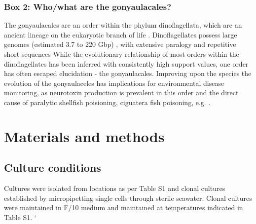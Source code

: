 \documentclass[12pt]{article}
\begin{document}
\subsubsection*{Box 2: Who/what are the gonyaulacales?}
The gonyaulacales are an order within the phylum dinoflagellata, which are an ancient lineage on the eukaryotic branch of life \cite{moldowan1998biogeochemical}. 
Dinoflagellates possess large genomes (estimated 3.7 to 220 Gbp) \cite{casabianca2017genome}, with extensive paralogy and repetitive short sequences %
While the evolutionary relationship of most orders within the dinoflagellates has been inferred with consistently high support values, one order has often escaped elucidation - the gonyaulacales. 
Improving upon the species the evolution of the gonyaulaceles has implications for environmental disease monitoring, as neurotoxin production is prevalent in this order and the direct cause of paralytic shellfish poisioning, ciguatera fish poisoning, e.g. \cite{shalchian2006combined,zhang2007three,saldarriaga2004molecular,hoppenrath2010dinoflagellate,murray2005improving}. 



\newpage
\section{Materials and methods}
\subsection*{Culture conditions}
\FloatBarrier
Cultures were isolated from locations as per Table S1 and clonal cultures established by micropipetting single cells through sterile seawater. 
Clonal cultures were maintained in F/10 medium and maintained at temperatures indicated in Table S1. 
`
\end{document}

